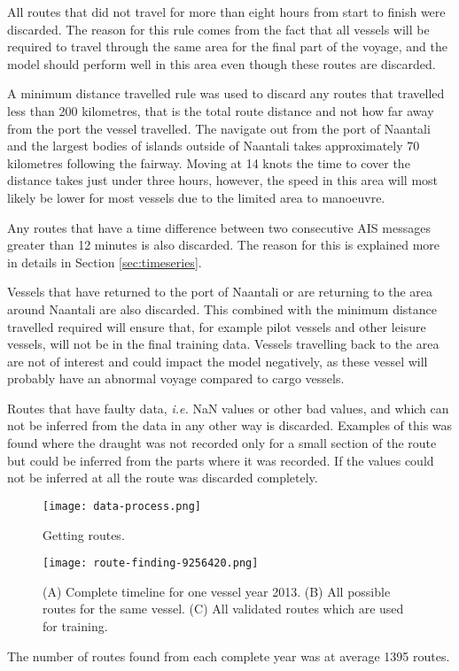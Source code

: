 \documentclass[../main.tex]{subfiles}
\begin{document}
All routes that did not travel for more than eight hours from start to finish were discarded. The reason for this rule comes from the fact that all vessels will be required to travel through the same area for the final part of the voyage, and the model should perform well in this area even though these routes are discarded.

A minimum distance travelled rule was used to discard any routes that travelled less than 200 kilometres, that is the total route distance and not how far away from the port the vessel travelled. The navigate out from the port of Naantali and the largest bodies of islands outside of Naantali takes approximately 70 kilometres following the fairway. Moving at 14 knots the time to cover the distance takes just under three hours, however, the speed in this area will most likely be lower for most vessels due to the limited area to manoeuvre.

Any routes that have a time difference between two consecutive AIS messages greater than 12 minutes is also discarded. The reason for this is explained more in details in Section \ref{sec:timeseries}.

Vessels that have returned to the port of Naantali or are returning to the area around Naantali are also discarded. This combined with the minimum distance travelled required will ensure that, for example pilot vessels and other leisure vessels, will not be in the final training data. Vessels travelling back to the area are not of interest and could impact the model negatively, as these vessel will probably have an abnormal voyage compared to cargo vessels.

Routes that have faulty data, \textit{i.e.} NaN values or other bad values, and which can not be inferred from the data in any other way is discarded. Examples of this was found where the draught was not recorded only for a small section of the route but could be inferred from the parts where it was recorded. If the values could not be inferred at all the route was discarded completely.

\begin{figure}[H]
	\centering
	\texttt{[image: data-process.png]}
	\caption{Getting routes.}
	\label{fig:flowchart}
\end{figure}

\begin{figure}[H]
	\centering
	\texttt{[image: route-finding-9256420.png]}
	\caption{(A) Complete timeline for one vessel year 2013. (B) All possible routes for the same vessel. (C) All validated routes which are used for training. }
	\label{fig:route-finding}
\end{figure}
%
%
The number of routes found from each complete year was at average 1395 routes. 
\end{document}
